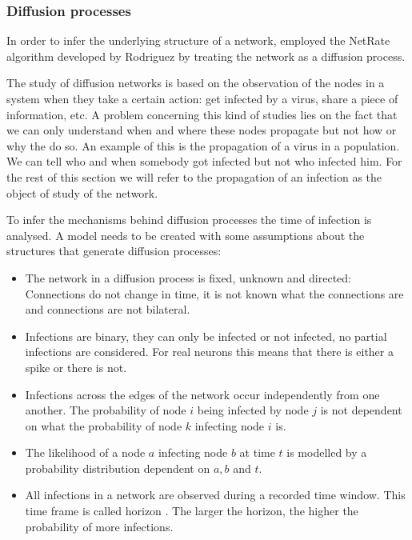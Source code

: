 \documentclass[11pt]{article}
\begin{document}
\subsubsection{Diffusion processes}\label{sec:diffusion_processes}

In order to infer the underlying structure of a network, \cite{alexandru2018estimating} employed the NetRate algorithm developed by Rodriguez \cite{rodriguez2011uncovering} by treating the network as a diffusion process.

The study of diffusion networks is based on the observation of the nodes in a system when they take a certain action: get infected by a virus, share a piece of information, etc. A problem concerning this kind of studies lies on the fact that we can only understand when and where these nodes propagate but not how or why the do so. An example of this is the propagation of a virus in a population. We can tell who and when somebody got infected but not who infected him. For the rest of this section we will refer to the propagation of an infection as the object of study of the network. 

To infer the mechanisms behind diffusion processes the time of infection is analysed. A model needs to be created with some assumptions about the structures that generate diffusion processes:

\begin{itemize}
\item The network in a diffusion process is fixed, unknown and directed: Connections do not change in time, it is not known what the connections are and connections are not bilateral.
\item Infections are binary, they can only be infected or not infected, no partial infections are considered. For real neurons this means that there is either a spike or there is not.
\item Infections across the edges of the network occur independently from one another. The probability of node $i$ being infected by node $j$ is not dependent on what the probability of node $k$ infecting node $i$ is.
\item The likelihood of a node $a$ infecting node $b$ at time $t$ is modelled by a probability distribution dependent on $a, b$ and $t$.
\item All infections in a network are observed during a recorded time window. This time frame is called horizon \cite{rodriguez2011uncovering}. The larger the horizon, the higher the probability of more infections.
\end{itemize}
\end{document}
